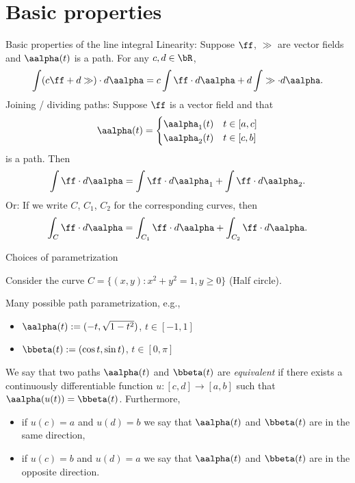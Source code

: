 \section{Basic properties}



    {Basic properties of the line integral}
    {Linearity:}
    Suppose \(\ff\), \(\gg\) are vector fields and \(\aalpha(t)\) is a path. For any \(c,d\in \bR\),
    \[
        \int (c\ff + d\gg) \cdot d\aalpha =  c \int \ff  \cdot d\aalpha +  d \int \gg \cdot d\aalpha.
    \]
    {Joining / dividing paths:}
    Suppose \(\ff\) is a vector field and that
    \[
        \aalpha(t) = \begin{cases}
            \aalpha_1(t) & t\in [a,c] \\
            \aalpha_2(t) & t\in [c,b]
        \end{cases}
    \]
    is a path.
    Then
    \[
        \int \ff  \cdot d\aalpha = \int \ff  \cdot d\aalpha_1  + \int \ff  \cdot d\aalpha_2.
    \]
    {Or:}
    If we write \(C\), \(C_1\), \(C_2\) for the corresponding curves, then
    \[
        \int_{C} \ff  \cdot d\aalpha = \int_{C_1} \ff  \cdot d\aalpha + \int_{C_2} \ff  \cdot d\aalpha.
    \]







    {Choices of parametrization}

    Consider the curve \(C = \{(x,y) : x^2 + y^2 = 1, y\geq 0\}\) (Half circle).

    Many possible path parametrization, e.g.,

    \begin{itemize}
        \item     \(\aalpha(t):= ( -t , \sqrt{1-t^2})\), \(t\in [-1,1]\)
        \item  \(\bbeta(t) := (\cos t, \sin t)\), \(t\in [0,\pi]\)
    \end{itemize}


    \begin{definition}
        We say that two paths \(\aalpha(t)\) and \(\bbeta(t)\) are \emph{equivalent} if there exists a continuously differentiable function \(u : [c,d] \to [a,b] \) such that \(\aalpha(u(t)) = \bbeta(t)\).
        Furthermore,
        \begin{itemize}
            \item if \(u(c)=a\) and \(u(d)=b\) we say that  \(\aalpha(t)\) and \(\bbeta(t)\) are in the same direction,
            \item if \(u(c)=b\) and \(u(d)=a\) we say that  \(\aalpha(t)\) and \(\bbeta(t)\) are in the opposite direction.
        \end{itemize}
    \end{definition}






